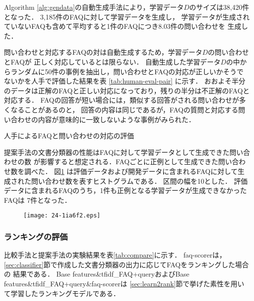 \documentclass[japanese]{jnlp_1.4}
\begin{document}
Algorithm \ref{alg:gendata}の自動生成手法により，学習データ$D$のサイズは38,420件となった．
3,185件のFAQに対して学習データを生成し，
学習データが生成されていないFAQも含めて平均すると1件のFAQにつき8.03件の問い合わせを
生成した．

問い合わせと対応するFAQの対は自動生成するため，学習データ$D$の問い合わせとFAQが
正しく対応しているとは限らない．
自動生成した学習データ$D$の中からランダムに50件の事例を抽出し，問い合わせとFAQの対応が正しいかそうでないかを人手で評価した結果を表
\ref{tab:human-eval-pair}
に示す．
おおよそ半分のデータは正解のFAQと正しい対応になっており，残りの半分は不正解のFAQと対応する．
FAQの回答が短い場合には，類似する回答がされる問い合わせが多くなることがあるのと，
回答の内容は同じであるが，FAQの質問と対応する問い合わせの内容が意味的に一致しないような事例がみられた．

\begin{table}[b]
\caption{人手によるFAQと問い合わせの対応の評価}
\label{tab:human-eval-pair}

\end{table}

提案手法の文書分類器の性能はFAQに対して学習データとして生成できた問い合わせの数
が影響すると想定される．FAQごとに正例として生成できた問い合わせ数を調べた．
図\ref{fig:histogram-train}
は評価データおよび開発データに含まれるFAQに対して生成された問い合わせ数を表すヒストグラムである．
区間の幅を10とした．
評価データに含まれるFAQのうち，1件も正例となる学習データが生成できなかったFAQは
7件となった．

\begin{figure}[t]
\begin{center}
\texttt{[image: 24-1ia6f2.eps]}
\end{center}
\label{fig:histogram-train}
\end{figure}


\subsubsection{ランキングの評価}

比較手法と提案手法の実験結果を表\ref{tab:compare}に示す．
faq-scorerは，\ref{sec:classifier}節で作成した文書分類器の出力に応じてFAQをランキングした場合の
結果である．
  Base features\&tfidf\_FAQ+queryおよびBase features\&tfidf\_FAQ+query\&faq-scorerは
\ref{sec:learn2rank}節で挙げた素性を用いて学習したランキングモデルである．
\end{document}
